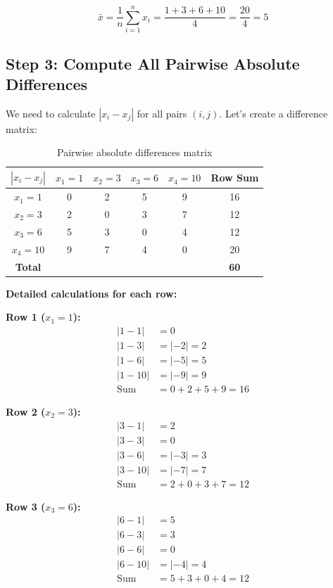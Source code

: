 \documentclass[12pt,a4paper]{article}
\theoremstyle{definition}
\begin{document}
\[
\bar{x} = \frac{1}{n}\sum_{i=1}^n x_i = \frac{1 + 3 + 6 + 10}{4} = \frac{20}{4} = 5
\]

\subsection{Step 3: Compute All Pairwise Absolute Differences}

We need to calculate $|x_i - x_j|$ for all pairs $(i,j)$. Let's create a difference matrix:

\begin{table}[h]
\centering
\begin{tabular}{c|cccc|c}
\toprule
$|x_i - x_j|$ & $x_1=1$ & $x_2=3$ & $x_3=6$ & $x_4=10$ & Row Sum \\
\midrule
$x_1=1$ & 0 & 2 & 5 & 9 & 16 \\
$x_2=3$ & 2 & 0 & 3 & 7 & 12 \\
$x_3=6$ & 5 & 3 & 0 & 4 & 12 \\
$x_4=10$ & 9 & 7 & 4 & 0 & 20 \\
\midrule
\textbf{Total} & & & & & \textbf{60} \\
\bottomrule
\end{tabular}
\caption{Pairwise absolute differences matrix}
\end{table}

\textbf{Detailed calculations for each row:}

\textbf{Row 1 ($x_1 = 1$):}
\begin{align*}
|1-1| &= 0 \\
|1-3| &= |{-2}| = 2 \\
|1-6| &= |{-5}| = 5 \\
|1-10| &= |{-9}| = 9 \\
\text{Sum} &= 0 + 2 + 5 + 9 = 16
\end{align*}

\textbf{Row 2 ($x_2 = 3$):}
\begin{align*}
|3-1| &= 2 \\
|3-3| &= 0 \\
|3-6| &= |{-3}| = 3 \\
|3-10| &= |{-7}| = 7 \\
\text{Sum} &= 2 + 0 + 3 + 7 = 12
\end{align*}

\textbf{Row 3 ($x_3 = 6$):}
\begin{align*}
|6-1| &= 5 \\
|6-3| &= 3 \\
|6-6| &= 0 \\
|6-10| &= |{-4}| = 4 \\
\text{Sum} &= 5 + 3 + 0 + 4 = 12
\end{align*}
\end{document}
